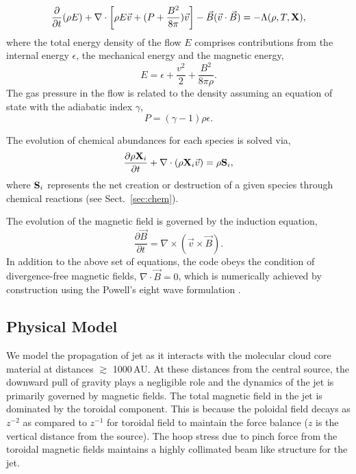 \documentclass[useAMS,usenatbib]{mn2e}
\begin{document}
\begin{equation}\label{encons1}
\frac{\partial}{\partial t}(\rho E)
+ \nabla \cdot\left[ \rho E \vec{v} + (P + \frac{B^2}{8\pi})\vec{v}\right]  
- \vec{B}(\vec{v}\cdot\vec{B}) = -\Lambda(\rho,T,{\bf{X}}),
\end{equation}
%
%
where the total energy density of the flow $E$ comprises contributions from 
the internal energy $\epsilon$, the mechanical energy and the magnetic energy,
%
\begin{equation}\label{encons2}
 E = \epsilon + \frac{v^2}{2} + \frac{B^2}{8 \pi \rho}.
\end{equation}
The gas pressure in the flow is related to the density assuming an equation 
of state with the adiabatic index $\gamma$,
%
\begin{equation}\label{EOS}
P = (\gamma - 1) \rho \epsilon.
\end{equation}

The evolution of chemical abundances for each species is solved via,
%
\begin{equation}\label{chemevol}
\frac{\partial \rho{\bf{X}}_{i}}{\partial t} + \nabla \cdot (\rho
{\bf{X}}_{i} \vec{v})  = \rho {\bf{S}}_{i},
\end{equation}
where ${\bf{S}}_{i}$ represents the net creation or destruction of a
given species through chemical reactions (see Sect.~\ref{sec:chem}).

The evolution of the magnetic field is governed by the induction equation,
%
\begin{equation}\label{induction}
\frac{\partial \vec{B}}{\partial t} = \nabla \times \left(\vec{v}\times \vec{B}\right).
\end{equation}
%
In addition to the above set of equations, the code obeys the condition of divergence-free 
magnetic fields, $\nabla \cdot \vec{B} = 0$, which is numerically achieved by construction 
using the Powell's eight wave formulation \citep{Powell:1999p14822}.

\subsection{Physical Model}
We model the propagation of jet as it interacts with the molecular
cloud core material at distances $\gtrsim$ 1000\,AU. 
At these distances from the central source, the downward pull of gravity plays a
negligible role and the dynamics of the jet is primarily governed by magnetic fields.
The total magnetic field in the jet is dominated by the toroidal
component. This is because the poloidal field decays as $z^{-2}$ as
compared to $z^{-1}$ for toroidal field to maintain the force balance
($z$ is the vertical distance from the source). 
The hoop stress due to pinch force from the toroidal magnetic fields maintains
a highly collimated beam like structure for the jet.
%
\end{document}
